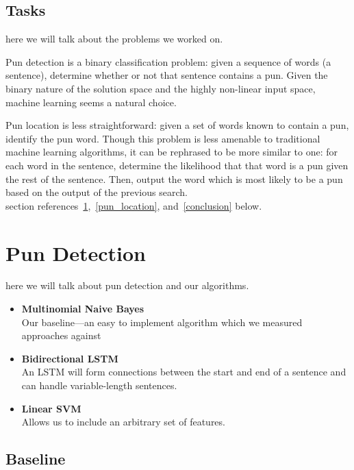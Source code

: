 \documentclass{article}
\begin{document}
\subsection{Tasks}

here we will talk about the problems we worked on.

Pun detection is a binary classification problem: given a sequence of words (a
sentence), determine whether or not that sentence contains a pun. Given the
binary nature of the solution space and the highly non-linear input space,
machine learning seems a natural choice.

Pun location is less straightforward: given a set of words known to contain a
pun, identify the pun word. Though this problem is less amenable to traditional
machine learning algorithms, it can be rephrased to be more similar to one: for
each word in the sentence, determine the likelihood that that word is a pun
given the rest of the sentence. Then, output the word which is most likely to
be a pun based on the output of the previous search.\\

section references~\ref{pun_detection},~\ref{pun_location},
and~\ref{conclusion} below.

\section{Pun Detection}\label{pun_detection}

here we will talk about pun detection and our algorithms.

\begin{itemize}
	\item {\textbf{Multinomial Naive Bayes}\\
		Our baseline---an easy to implement algorithm which we measured approaches against
	}
	\item {\textbf{Bidirectional LSTM}\\
		An LSTM will form connections between the start and end of a sentence and can handle variable-length sentences.
	}
	\item {\textbf{Linear SVM}\\ 
		Allows us to include an arbitrary set of features.
	}
\end{itemize}

\subsection{Baseline}
\end{document}

